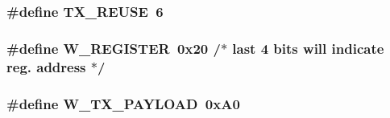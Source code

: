 \hypertarget{a00013_a506a58de7b75af27e3745db3e1e9733c}{
\subsubsection[{T\-X\-\_\-\-R\-E\-U\-S\-E}]{\setlength{\rightskip}{0pt plus 5cm}\#define T\-X\-\_\-\-R\-E\-U\-S\-E~6}}\label{a00013_a506a58de7b75af27e3745db3e1e9733c}
\hypertarget{a00013_a3b68b214d5753039d2c156ad57cd7153}{
\subsubsection[{W\-\_\-\-R\-E\-G\-I\-S\-T\-E\-R}]{\setlength{\rightskip}{0pt plus 5cm}\#define W\-\_\-\-R\-E\-G\-I\-S\-T\-E\-R~0x20 /$\ast$ last 4 bits will indicate reg. address $\ast$/}}\label{a00013_a3b68b214d5753039d2c156ad57cd7153}
\hypertarget{a00013_afd12673bc8ca8559b0eee395e8845982}{
\subsubsection[{W\-\_\-\-T\-X\-\_\-\-P\-A\-Y\-L\-O\-A\-D}]{\setlength{\rightskip}{0pt plus 5cm}\#define W\-\_\-\-T\-X\-\_\-\-P\-A\-Y\-L\-O\-A\-D~0x\-A0}}\label{a00013_afd12673bc8ca8559b0eee395e8845982}


